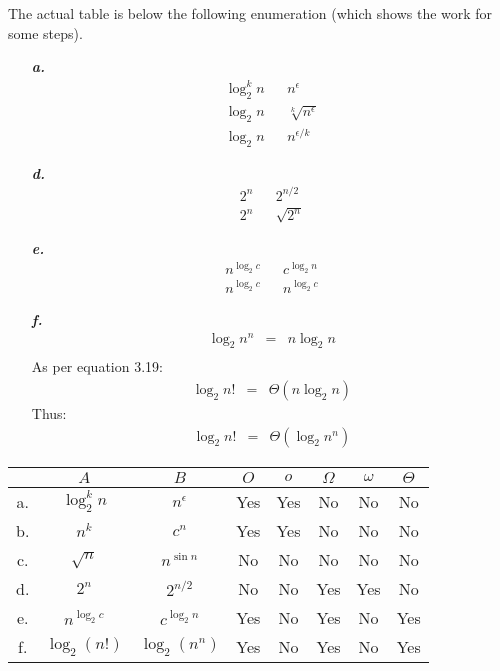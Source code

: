 The actual table is below the following enumeration (which shows the work for some steps).

\noindent\begin{enumerate}
	\item[\textbf{\textit{a.}}]
		\begin{eqnarray*}
			\log_2 ^k n & & n^\epsilon \\
			\log_2 n & & \sqrt[k]{n^\epsilon} \\
			\log_2 n & & n^{\epsilon / k}
		\end{eqnarray*}
	\item[\textbf{\textit{d.}}]
		\begin{eqnarray*}
			2^n & & 2^{n/2} \\
			2^n & & \sqrt{2^n}
		\end{eqnarray*}
	\item[\textbf{\textit{e.}}]
		\begin{eqnarray*}
			n^{\log_2 c} & & c^{\log_2 n} \\
			n^{\log_2 c} & & n^{\log_2 c}
		\end{eqnarray*}
	\item[\textbf{\textit{f.}}]
		\begin{eqnarray*}
			\log_2 n^n & = & n \log_2 n \\
		\end{eqnarray*}
		As per equation 3.19:
		\begin{eqnarray*}
			\log_2 n! & = & \Theta(n \log_2 n)
		\end{eqnarray*}
		Thus:
		\begin{eqnarray*}
			\log_2 n! & = & \Theta(\log_2 n^n)
		\end{eqnarray*}
\end{enumerate}

\noindent\begin{tabular}{c|c c|c|c|c|c|c|}
	 & $A$ & $B$ & $O$ & $o$ & $\Omega$ & $\omega$ & $\Theta$ \\ \hline
	a. & $\log_2 ^k n$ & $n^\epsilon$ & Yes & Yes & No & No & No \\ \hline
	b. & $n^k$ & $c^n$ & Yes & Yes & No & No & No \\ \hline
	c. & $\sqrt{n}$ & $n^{\sin n}$ & No & No & No & No & No \\ \hline
	d. & $2^n$ & $2^{n / 2}$ & No & No & Yes & Yes & No \\ \hline
	e. & $n^{\log_2 c}$ & $c^{\log_2 n}$ & Yes & No & Yes & No & Yes \\ \hline
	f. & $\log_2 (n!)$ & $\log_2 (n^n)$ & Yes & No & Yes & No & Yes \\ \hline
\end{tabular}

